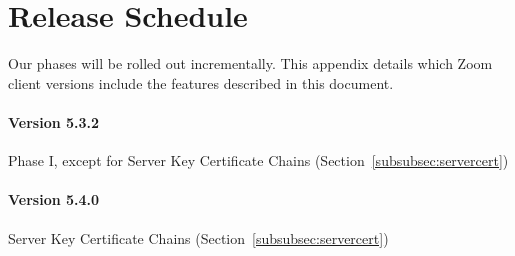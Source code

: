 \section{Release Schedule}
\label{appendix:releases}
Our phases will be rolled out incrementally. This appendix details which Zoom client versions include the features described in this document.

\paragraph{Version 5.3.2}
Phase I, except for Server Key Certificate Chains (Section~\ref{subsubsec:servercert})

\paragraph{Version 5.4.0}
Server Key Certificate Chains (Section~\ref{subsubsec:servercert})